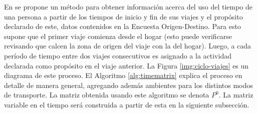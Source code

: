 En \cite{Munizaga2011} se propone un método para obtener información acerca del uso del tiempo de una persona a partir de los tiempos de inicio y fin de sus viajes y el propósito declarado de este, datos contenidos en la Encuesta Origen-Destino. Para esto supone que el primer viaje comienza desde el hogar (esto puede verificarse revisando que calcen la zona de origen del viaje con la del hogar). Luego, a cada período de tiempo entre dos viajes consecutivos es asignado a la actividad declarada como propósito en el viaje anterior. La Figura \ref{img:ciclo-viajes} es un diagrama de este proceso. El Algoritmo \ref{alg:timematrix} explica el proceso en detalle de manera general, agregando además ambientes para los distintos modos de transporte. La matriz obtenida usando este algoritmo se denota \(P^0\). La matriz variable en el tiempo será construida a partir de esta en la siguiente subsección.

